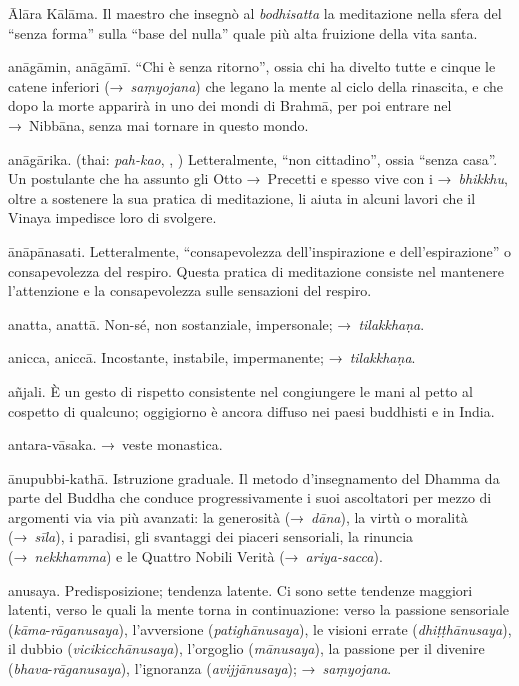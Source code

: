 \begin{glossarydescription}
\item[Ālāra Kālāma.] Il maestro che insegnò al \emph{bodhisatta} la meditazione
  nella sfera del ``senza forma'' sulla ``base del nulla'' quale più alta
  fruizione della vita santa.

\item[anāgāmin, anāgāmī.] ``Chi è senza ritorno'', ossia chi ha divelto
  tutte e cinque le catene inferiori (→~\emph{saṃyojana}) che legano la mente al
  ciclo della rinascita, e che dopo la morte apparirà in uno dei mondi di
  Brahmā, per poi entrare nel →~Nibbāna, senza mai tornare in questo
  mondo.

\item[anāgārika.] (thai: \emph{pah-kao}, , )
  Letteralmente, ``non cittadino'', ossia ``senza casa''. Un postulante che ha
  assunto gli Otto →~Precetti e spesso vive con i →~\emph{bhikkhu}, oltre a
  sostenere la sua pratica di meditazione, li aiuta in alcuni lavori che il
  Vinaya impedisce loro di svolgere.

\item[ānāpānasati.] Letteralmente, ``consapevolezza dell'inspirazione e
  dell'espirazione'' o consapevolezza del respiro. Questa pratica di meditazione
  consiste nel mantenere l'attenzione e la consapevolezza sulle sensazioni del
  respiro.

\item[anatta, anattā.] Non-sé, non sostanziale, impersonale;
  →~\emph{tilakkhaṇa}.

\item[anicca, aniccā.] Incostante, instabile, impermanente;
  →~\emph{tilakkhaṇa}.

\item[añjali.] È un gesto di rispetto consistente nel congiungere le mani
  al petto al cospetto di qualcuno; oggigiorno è ancora diffuso nei paesi
  buddhisti e in India.

\item[antara-vāsaka.] →~veste monastica.

\item[ānupubbi-kathā.] Istruzione graduale. Il metodo d'insegnamento del
  Dhamma da parte del Buddha che conduce progressivamente i suoi ascoltatori per
  mezzo di argomenti via via più avanzati: la generosità (→~\emph{dāna}), la
  virtù o moralità (→~\emph{sīla}), i paradisi, gli svantaggi dei piaceri
  sensoriali, la rinuncia (→~\emph{nekkhamma}) e le Quattro Nobili Verità
  (→~\emph{ariya-sacca}).

\item[anusaya.] Predisposizione; tendenza latente. Ci sono sette tendenze
  maggiori latenti, verso le quali la mente torna in continuazione: verso la
  passione sensoriale (\emph{kāma}-\emph{rāganusaya}), l'avversione
  (\emph{patighānusaya}), le visioni errate (\emph{dhiṭṭhānusaya}), il dubbio
  (\emph{vicikicchānusaya}), l'orgoglio (\emph{mānusaya}), la passione per il
  divenire (\emph{bhava}-\emph{rāganusaya}), l'ignoranza (\emph{avijjānusaya});
  →~\emph{saṃyojana}.


\end{glossarydescription}
